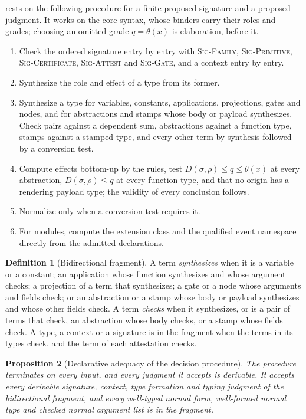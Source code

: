 \documentclass[11pt]{article}
\numberwithin{equation}{section}
\theoremstyle{definition}
\newtheorem{definition}{Definition}[section]
\theoremstyle{plain}
\newtheorem{proposition}[definition]{Proposition}
\theoremstyle{remark}
\begin{document}
 rests on the following procedure for a finite
proposed signature and a proposed judgment.  It works on the core syntax,
whose binders carry their roles and grades; choosing an omitted grade
\(q=\theta(x)\) is elaboration, before it.
\begin{enumerate}[label=(\arabic*),leftmargin=2.5em]
\item Check the ordered signature entry by entry with \textsc{Sig-Family},
\textsc{Sig-Primitive}, \textsc{Sig-Certificate}, \textsc{Sig-Attest} and
\textsc{Sig-Gate}, and a context entry by entry.
\item Synthesize the role and effect of a type from its former.
\item Synthesize a type for variables, constants, applications, projections,
gates and nodes, and for abstractions and stamps whose body or payload
synthesizes.  Check pairs against a dependent sum, abstractions against a
function type, stamps against a stamped type, and every other term by
synthesis followed by a conversion test.
\item Compute effects bottom-up by the rules, test
\(D(\sigma,\rho)\le q\le\theta(x)\) at every abstraction,
\(D(\sigma,\rho)\le q\) at every function type, and that no origin has a
rendering payload type; the validity of every conclusion follows.
\item Normalize only when a conversion test requires it.
\item For modules, compute the extension class and the qualified event
namespace directly from the admitted declarations.
\end{enumerate}

\begin{definition}[Bidirectional fragment]\label{def:fragment}
A term \emph{synthesizes} when it is a variable or a constant; an application
whose function synthesizes and whose argument checks; a projection of a term
that synthesizes; a gate or a node whose arguments and fields check; or an
abstraction or a stamp whose body or payload synthesizes and whose other
fields check.  A term \emph{checks} when it synthesizes, or is a pair of terms
that check, an abstraction whose body checks, or a stamp whose fields check.
A type, a context or a signature is in the fragment when the terms in its
types check, and the term of each attestation checks.
\end{definition}

\begin{proposition}[Declarative adequacy of the decision procedure]\label{prop:checker}
The procedure terminates on every input, and every judgment it accepts is
derivable.  It accepts every derivable signature, context, type formation and
typing judgment of the bidirectional fragment, and every well-typed normal
form, well-formed normal type and checked normal argument list is in the
fragment.
\end{proposition}
\end{document}
